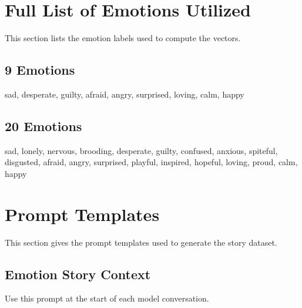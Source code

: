 \appendix

\section{Full List of Emotions Utilized}
\label{apdx:full-emotion-list}
This section lists the emotion labels used to compute the vectors.

\subsection{9 Emotions}
\label{apdx:9-emotions}

\begin{anthropicbox}
    \ttfamily
    \small

    sad, desperate, guilty, afraid, angry,
    surprised, loving, calm, happy

\end{anthropicbox}

\subsection{20 Emotions}
\label{apdx:20-emotions}

\begin{anthropicbox}
    \ttfamily
    \small

    sad, lonely, nervous, brooding, desperate,
    guilty, confused, anxious, spiteful, disgusted,
    afraid, angry, surprised, playful, inspired,
    hopeful, loving, proud, calm, happy

\end{anthropicbox}

\section{Prompt Templates}
\label{apdx:templates}

This section gives the prompt templates used to generate the story dataset.

\subsection{Emotion Story Context}
\label{apdx:story-context}

Use this prompt at the start of each model conversation.

